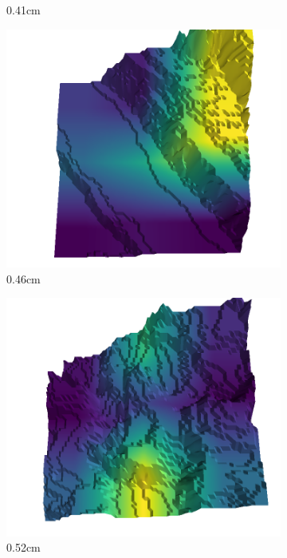 \begin{figure}[H]
\begin{subfigure}[b]{0.192\linewidth}
    \caption{0.41cm}
    \label{fig : quarry-false_positive-17}
    \end{subfigure}
    \begin{subfigure}[b]{0.192\linewidth}
    \includegraphics[width=\linewidth]{../img/5/quarry/false_positive/46-patch-3d-majavi-colormap-216.png}
    \caption{0.46cm}
    \label{fig : quarry-false_positive-18}
    \end{subfigure}
    \begin{subfigure}[b]{0.192\linewidth}
    \includegraphics[width=\linewidth]{../img/5/quarry/false_positive/51-patch-3d-majavi-colormap-228.png}
    \caption{0.52cm}
    \label{fig : quarry-false_positive-19}
    \end{subfigure}
    \caption{}
    \label{fig : quarry-false_positive}
    \end{figure}


% 
